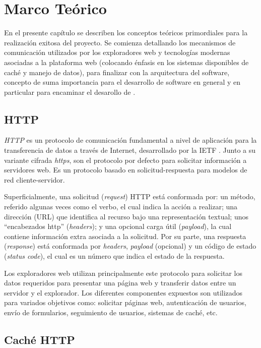 \chapter{Marco Teórico}

En el presente capítulo se describen los conceptos teóricos primordiales para la realización exitosa del proyecto. Se comienza detallando los mecanismos de comunicación utilizados por los exploradores web y tecnologías modernas asociadas a la plataforma web (colocando énfasis en los sistemas disponibles de caché y manejo de datos), para finalizar con la arquitectura del software, concepto de suma importancia para el desarrollo de software en general y en particular para encaminar el desarollo de \pwas.

\section{HTTP}

\textit{HTTP} es un protocolo de comunicación fundamental a nivel de aplicación para la transferencia de datos a través de Internet, desarrollado por la IETF \cite{http}. Junto a su variante cifrada \textit{https}, son el protocolo por defecto para solicitar información a servidores web. Es un protocolo basado en solicitud-respuesta para modelos de red cliente-servidor.

Superficialmente, una solicitud (\textit{request}) HTTP está conformada por: un método, referido algunas veces como el verbo, el cual indica la acción a realizar; una dirección (URL) que identifica al recurso bajo una representación textual; unos ``encabezados http'' (\textit{headers}); y una opcional carga útil (\textit{payload}), la cual contiene información extra asociada a la solicitud. Por su parte, una respuesta (\textit{response}) está conformada por \textit{headers}, \textit{payload} (opcional) y un código de estado (\textit{status code}), el cual es un número que indica el estado de la respuesta.

Los exploradores web utilizan principalmente este protocolo para solicitar los datos requeridos para presentar una página web y transferir datos entre un servidor y el explorador. Los diferentes componentes expuestos son utilizados para variados objetivos como: solicitar páginas web, autenticación de usuarios, envío de formularios, seguimiento de usuarios, sistemas de caché, etc.

\section{Caché HTTP}

